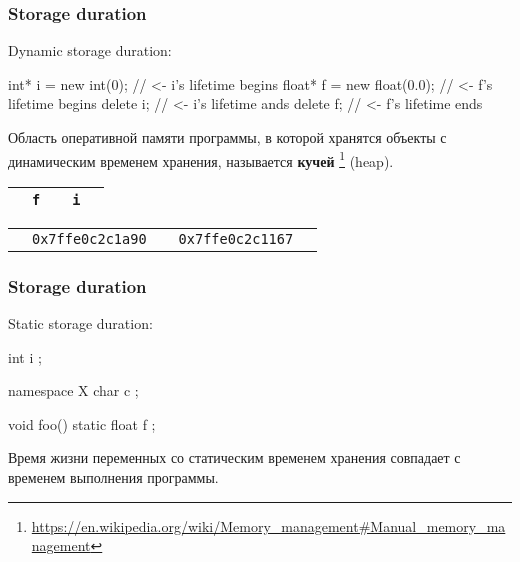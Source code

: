 \documentclass[compress, 8pt]{beamer}
\begin{document}
\begin{frame}[fragile]

    \frametitle{Storage duration}

    Dynamic storage duration:

    \begin{myinplacelisting}[minted language=cpp]
int* i = new int(0);        // <- i's lifetime begins
float* f = new float(0.0);  // <- f's lifetime begins
delete i;                   // <- i's lifetime ands
delete f;                   // <- f's lifetime ends
    \end{myinplacelisting}

    Область оперативной памяти программы, в которой хранятся объекты
    с динамическим временем хранения, называется \textbf{кучей}
    \footnote{\url{https://en.wikipedia.org/wiki/Memory\_management\#Manual\_memory\_management}}
    (heap).

    \hfill \break
    \centering

    \begin{tabular}{|m{2cm}|m{10mm}|m{1cm}|m{5mm}|m{1.5cm}|}
        \hline
        \hfill &
        \cellcolor{red!10} \verb|f| &
        \hfill &
        \cellcolor{green!10} \verb|i| &
        \hfill \\
        \hline
    \end{tabular}
    \begin{tabular}{m{2cm}m{10mm}m{1cm}m{5mm}m{1.5cm}}
        \hfill &
        \verb|0x7ffe0c2c1a90| &
        \hfill &
        \verb|0x7ffe0c2c1167| &
        \hfill \\
    \end{tabular}

\end{frame}

\begin{frame}[fragile]

    \frametitle{Storage duration}

    Static storage duration:

    \begin{myinplacelisting}[minted language=cpp]
int i {};

namespace X {
    char c {};
}

void foo() {
    static float f {};
}
    \end{myinplacelisting}

    Время жизни переменных со статическим временем хранения
    совпадает с временем выполнения программы.

\end{frame}
\end{document}
